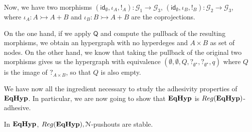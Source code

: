 \documentclass[a4paper,UKenglish,cleveref,pdftex,thm-restate,numberwithinsect]{lipics-v2021}
\newcommand{\quo}{\mathsf{Q}}
\newcommand{\catname}[1]{\textbf{\textup{#1}}}
\newcommand{\EqHyp}{\catname{EqHyp}} %
\newcommand{\reg}{\mathsf{Reg}}
\newcommand{\mto}{\rightarrowtail}
\newcommand{\id}[1]{\mathsf{id}_{#1}}
\begin{document}
{\begin{example}
Now, we have two morphisms $(\id{\emptyset}, \iota_A, !_A)\colon \mathcal{G}_1 \to \mathcal{G}_3$,  $(\id{\emptyset}, \iota_B, !_B)\colon  \mathcal{G}_2 \to \mathcal{G}_3$, where $\iota_A\colon A\mto A+B$  and $\iota_B\colon B \mto A+B$  are the coprojections.

On the one hand, if we apply $\quo$ and compute the pullback of the resulting morphisms, we obtain an hypergraph with no hyperdeges and $A\times B$ as set of nodes. On the other hand,  we know that taking the pullback of the original two morphisms gives us the hypergraph with equivalence $(\emptyset, \emptyset, Q, ?_{\emptyset^\star}, ?_{\emptyset^\star}, q)$ where $Q$ is the image of $?_{A\times B}$, so that $Q$ is also empty.  
\end{example}
}


We have now all the ingredient necessary to study the adhesivity properties of $\EqHyp$. In particular, we are now going to show that $\EqHyp$ is $\reg(\EqHyp)$-adhesive.

\begin{lemma}\label{lemma:stab}
	In $\EqHyp$, $\reg(\EqHyp), \mathcal{N}$-pushouts are stable.
\end{lemma}
\end{document}
